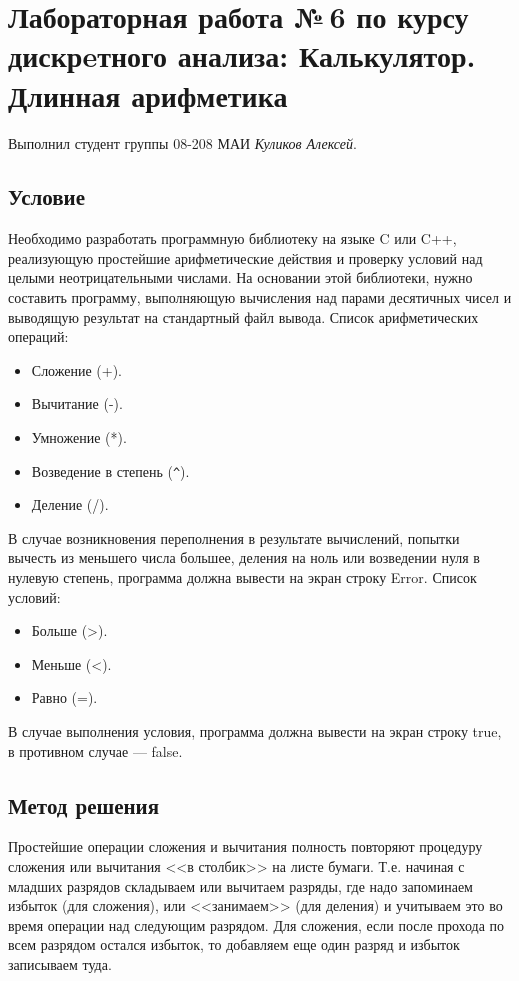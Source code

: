 \documentclass[12pt]{article}
\begin{document}
\section*{Лабораторная работа №\,6 по курсу дискрeтного анализа: Калькулятор. Длинная арифметика}

Выполнил студент группы 08-208 МАИ \textit{Куликов Алексей}.

\subsection*{Условие}

Необходимо разработать программную библиотеку на языке C или
C++, реализующую простейшие арифметические действия и проверку
условий над целыми неотрицательными числами. На основании этой
библиотеки, нужно составить программу, выполняющую вычисления
над парами десятичных чисел и выводящую результат на стандартный
файл вывода.
Список арифметических операций:
\begin{itemize}
    \item Сложение (+).
    \item Вычитание (-).
    \item Умножение (*).
    \item Возведение в степень (\verb|^|).
    \item Деление (/).
\end{itemize}

В случае возникновения переполнения в результате вычислений,
попытки вычесть из меньшего числа большее, деления на ноль или
возведении нуля в нулевую степень, программа должна вывести на
экран строку Error.
Список условий:
\begin{itemize}
    \item Больше (>).
    \item Меньше (<).
    \item Равно (=).
\end{itemize}
В случае выполнения условия, программа должна вывести на экран
строку true, в противном случае — false.

\subsection*{Метод решения}

Простейшие операции сложения и вычитания полность повторяют процедуру сложения или вычитания <<в столбик>> на листе бумаги. Т.е. начиная с младших разрядов складываем или вычитаем разряды, где надо запоминаем избыток (для сложения), или <<занимаем>> (для деления) и учитываем это во время операции над следующим разрядом. Для сложения, если после прохода по всем разрядом остался избыток, то добавляем еще один разряд и избыток записываем туда.
\end{document}
